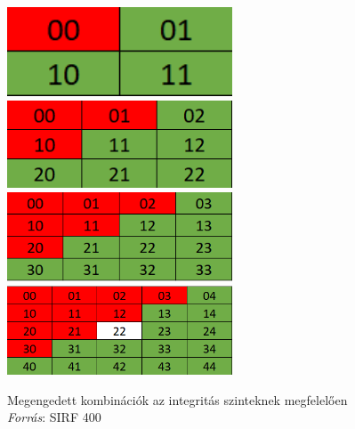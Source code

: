 \begin{figure}[!ht]
	\centering
	\includegraphics[width=67mm, keepaspectratio]{figures/sirf_sil1.png}\hspace{1cm}
	\includegraphics[width=67mm, keepaspectratio]{figures/sirf_sil2.png}\\\vspace{1cm}
	\includegraphics[width=67mm, keepaspectratio]{figures/sirf_sil3.png}\hspace{1cm}
	\includegraphics[width=67mm, keepaspectratio]{figures/sirf_sil4.png}
	\caption{Megengedett kombinációk az integritás szinteknek megfelelően \emph{Forrás}: SIRF 400}
	\label{fig:sirfSIL}
\end{figure}